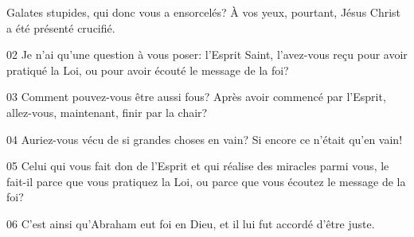 Galates stupides, qui donc vous a ensorcelés? À vos yeux, pourtant, Jésus Christ a été présenté crucifié.

02 Je n’ai qu’une question à vous poser: l’Esprit Saint, l’avez-vous reçu pour avoir pratiqué la Loi, ou pour avoir écouté le message de la foi?

03 Comment pouvez-vous être aussi fous? Après avoir commencé par l’Esprit, allez-vous, maintenant, finir par la chair?

04 Auriez-vous vécu de si grandes choses en vain? Si encore ce n’était qu’en vain!

05 Celui qui vous fait don de l’Esprit et qui réalise des miracles parmi vous, le fait-il parce que vous pratiquez la Loi, ou parce que vous écoutez le message de la foi?

06 C’est ainsi qu’Abraham eut foi en Dieu, et il lui fut accordé d’être juste.
